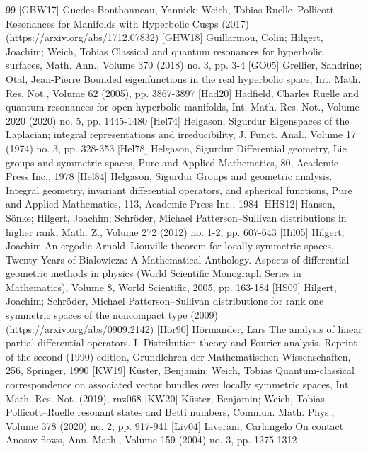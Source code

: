 \begin{thebibliography}{99}
 [GBW17] Guedes Bonthonneau, Yannick; Weich, Tobias Ruelle–Pollicott Resonances for Manifolds with Hyperbolic Cusps (2017) (https://arxiv.org/abs/1712.07832)
 [GHW18] Guillarmou, Colin; Hilgert, Joachim; Weich, Tobias Classical and quantum resonances for hyperbolic surfaces, Math. Ann., Volume 370 (2018) no. 3, pp. 3-4
 [GO05] Grellier, Sandrine; Otal, Jean-Pierre Bounded eigenfunctions in the real hyperbolic space, Int. Math. Res. Not., Volume 62 (2005), pp. 3867-3897
 [Had20] Hadfield, Charles Ruelle and quantum resonances for open hyperbolic manifolds, Int. Math. Res. Not., Volume 2020 (2020) no. 5, pp. 1445-1480
 [Hel74] Helgason, Sigurdur Eigenspaces of the Laplacian; integral representations and irreducibility, J. Funct. Anal., Volume 17 (1974) no. 3, pp. 328-353
 [Hel78] Helgason, Sigurdur Differential geometry, Lie groups and symmetric spaces, Pure and Applied Mathematics, 80, Academic Press Inc., 1978
 [Hel84] Helgason, Sigurdur Groups and geometric analysis. Integral geometry, invariant differential operators, and spherical functions, Pure and Applied Mathematics, 113, Academic Press Inc., 1984
 [HHS12] Hansen, Sönke; Hilgert, Joachim; Schröder, Michael Patterson–Sullivan distributions in higher rank, Math. Z., Volume 272 (2012) no. 1-2, pp. 607-643
 [Hil05] Hilgert, Joachim An ergodic Arnold–Liouville theorem for locally symmetric spaces, Twenty Years of Bialowieza: A Mathematical Anthology. Aspects of differential geometric methods in physics (World Scientific Monograph Series in Mathematics), Volume 8, World Scientific, 2005, pp. 163-184
 [HS09] Hilgert, Joachim; Schröder, Michael Patterson–Sullivan distributions for rank one symmetric spaces of the noncompact type (2009) (https://arxiv.org/abs/0909.2142)
 [Hör90] Hörmander, Lars The analysis of linear partial differential operators. I. Distribution theory and Fourier analysis. Reprint of the second (1990) edition, Grundlehren der Mathematischen Wissenschaften, 256, Springer, 1990
 [KW19] Küster, Benjamin; Weich, Tobias Quantum-classical correspondence on associated vector bundles over locally symmetric spaces, Int. Math. Res. Not. (2019), rnz068
 [KW20] Küster, Benjamin; Weich, Tobias Pollicott–Ruelle resonant states and Betti numbers, Commun. Math. Phys., Volume 378 (2020) no. 2, pp. 917-941
 [Liv04] Liverani, Carlangelo On contact Anosov flows, Ann. Math., Volume 159 (2004) no. 3, pp. 1275-1312

\end{thebibliography}
